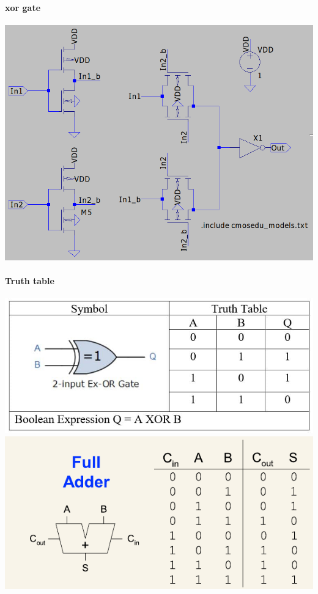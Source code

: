 \documentclass{homeworg}
\begin{document}
\paragraph{xor gate}
\begin{center}
    \includegraphics[scale=0.5]{xor.png}
\end{center}

\paragraph{Truth table}
\begin{center}
    \includegraphics[scale=0.5]{XOR-Gate-truth-table.jpg}
    \includegraphics[scale=0.8]{fulladder_truth.png}
\end{center}
\end{document}
